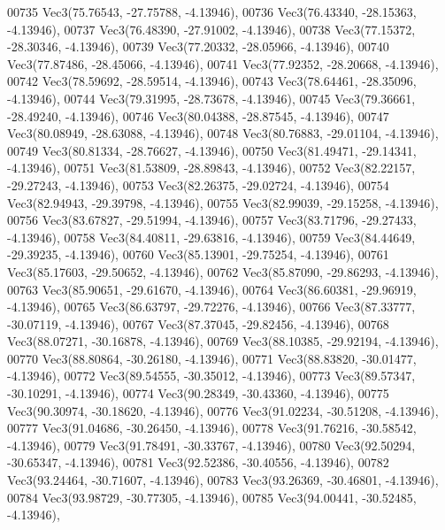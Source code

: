 \begin{DoxyCode}
00735         Vec3(75.76543, -27.75788, -4.13946),
00736         Vec3(76.43340, -28.15363, -4.13946),
00737         Vec3(76.48390, -27.91002, -4.13946),
00738         Vec3(77.15372, -28.30346, -4.13946),
00739         Vec3(77.20332, -28.05966, -4.13946),
00740         Vec3(77.87486, -28.45066, -4.13946),
00741         Vec3(77.92352, -28.20668, -4.13946),
00742         Vec3(78.59692, -28.59514, -4.13946),
00743         Vec3(78.64461, -28.35096, -4.13946),
00744         Vec3(79.31995, -28.73678, -4.13946),
00745         Vec3(79.36661, -28.49240, -4.13946),
00746         Vec3(80.04388, -28.87545, -4.13946),
00747         Vec3(80.08949, -28.63088, -4.13946),
00748         Vec3(80.76883, -29.01104, -4.13946),
00749         Vec3(80.81334, -28.76627, -4.13946),
00750         Vec3(81.49471, -29.14341, -4.13946),
00751         Vec3(81.53809, -28.89843, -4.13946),
00752         Vec3(82.22157, -29.27243, -4.13946),
00753         Vec3(82.26375, -29.02724, -4.13946),
00754         Vec3(82.94943, -29.39798, -4.13946),
00755         Vec3(82.99039, -29.15258, -4.13946),
00756         Vec3(83.67827, -29.51994, -4.13946),
00757         Vec3(83.71796, -29.27433, -4.13946),
00758         Vec3(84.40811, -29.63816, -4.13946),
00759         Vec3(84.44649, -29.39235, -4.13946),
00760         Vec3(85.13901, -29.75254, -4.13946),
00761         Vec3(85.17603, -29.50652, -4.13946),
00762         Vec3(85.87090, -29.86293, -4.13946),
00763         Vec3(85.90651, -29.61670, -4.13946),
00764         Vec3(86.60381, -29.96919, -4.13946),
00765         Vec3(86.63797, -29.72276, -4.13946),
00766         Vec3(87.33777, -30.07119, -4.13946),
00767         Vec3(87.37045, -29.82456, -4.13946),
00768         Vec3(88.07271, -30.16878, -4.13946),
00769         Vec3(88.10385, -29.92194, -4.13946),
00770         Vec3(88.80864, -30.26180, -4.13946),
00771         Vec3(88.83820, -30.01477, -4.13946),
00772         Vec3(89.54555, -30.35012, -4.13946),
00773         Vec3(89.57347, -30.10291, -4.13946),
00774         Vec3(90.28349, -30.43360, -4.13946),
00775         Vec3(90.30974, -30.18620, -4.13946),
00776         Vec3(91.02234, -30.51208, -4.13946),
00777         Vec3(91.04686, -30.26450, -4.13946),
00778         Vec3(91.76216, -30.58542, -4.13946),
00779         Vec3(91.78491, -30.33767, -4.13946),
00780         Vec3(92.50294, -30.65347, -4.13946),
00781         Vec3(92.52386, -30.40556, -4.13946),
00782         Vec3(93.24464, -30.71607, -4.13946),
00783         Vec3(93.26369, -30.46801, -4.13946),
00784         Vec3(93.98729, -30.77305, -4.13946),
00785         Vec3(94.00441, -30.52485, -4.13946),

\end{DoxyCode}
